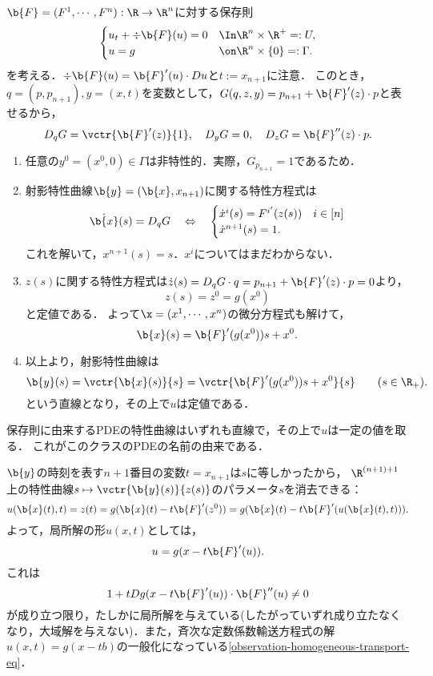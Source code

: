 \documentclass[uplatex,dvipdfmx]{jsreport}
\begin{document}
\begin{example}[保存則に由来するPDEに対する特性曲線法]
    $\b{F}=(F^1,\cdots,F^n):\R\to\R^n$に対する保存則
    \[\begin{cases}
        u_t+\div\b{F}(u)=0&\In\R^n\times\R^+=:U,\\
        u=g&\on\R^n\times\{0\}=:\Gamma.
    \end{cases}\]
    を考える．$\div\b{F}(u)=\b{F}'(u)\cdot Du$と$t:=x_{n+1}$に注意．
    このとき，$q=(p,p_{n+1}),y=(x,t)$を変数として，$G(q,z,y)=p_{n+1}+\b{F}'(z)\cdot p$と表せるから，
    \[D_qG=\vctr{\b{F}'(z)}{1},\quad D_yG=0,\quad D_zG=\b{F}''(z)\cdot p.\]
    \begin{enumerate}
        \item 任意の$y^0=(x^0,0)\in\Gamma$は非特性的．実際，$G_{p_{n+1}}=1$であるため．
        \item 射影特性曲線$\b{y}=(\b{x},x_{n+1})$に関する特性方程式は
        \[\dot{\b{x}}(s)=D_qG\quad\Leftrightarrow\quad\begin{cases}
            \dot{x}^i(s)=F^{i'}(z(s))&i\in[n]\\
            \dot{x}^{n+1}(s)=1.
        \end{cases}\]
        これを解いて，$x^{n+1}(s)=s$．$x^i$についてはまだわからない．
        \item $z(s)$に関する特性方程式は$\dot{z}(s)=D_qG\cdot q=p_{n+1}+\b{F}'(z)\cdot p=0$より，
        \[z(s)=z^0=g(x^0)\]
        と定値である．
        よって$\x=(x^1,\cdots,x^n)$の微分方程式も解けて，
        \[\b{x}(s)=\b{F}'(g(x^0))s+x^0.\]
        \item 以上より，射影特性曲線は
        \[\b{y}(s)=\vctr{\b{x}(s)}{s}=\vctr{\b{F}'(g(x^0))s+x^0}{s}\qquad(s\in\R_+).\]
        という直線となり，その上で$u$は定値である．
    \end{enumerate}
\end{example}
\begin{remarks}
    保存則に由来するPDEの特性曲線はいずれも直線で，その上で$u$は一定の値を取る．
    これがこのクラスのPDEの名前の由来である．
\end{remarks}

\begin{remark}[陰関数表示について]
    $\b{y}$の時刻を表す$n+1$番目の変数$t=x_{n+1}$は$s$に等しかったから，
    $\R^{(n+1)+1}$上の特性曲線$s\mapsto\vctr{\b{y}(s)}{z(s)}$のパラメータ$s$を消去できる：
    \[u(\b{x}(t),t)=z(t)=g(\b{x}(t)-t\b{F}'(z^0))=g(\b{x}(t)-t\b{F}'(u(\b{x}(t),t))).\]
    よって，局所解の形$u(x,t)$としては，
    \[u=g(x-t\b{F}'(u)).\]
    これは
    \[1+tDg(x-t\b{F}'(u))\cdot\b{F}''(u)\ne0\]
    が成り立つ限り，たしかに局所解を与えている(したがっていずれ成り立たなくなり，大域解を与えない)．また，斉次な定数係数輸送方程式の解$u(x,t)=g(x-tb)$の一般化になっている\ref{observation-homogeneous-transport-eq}．
\end{remark}
\end{document}
